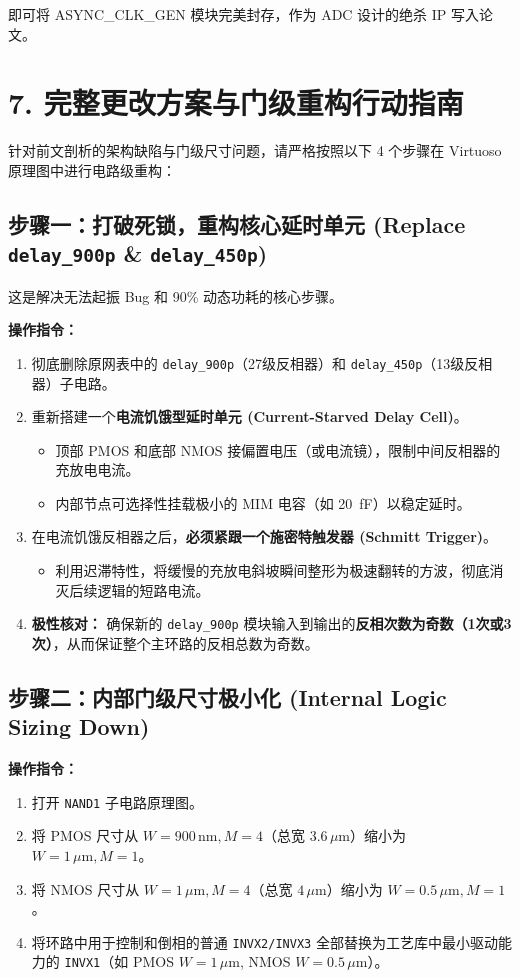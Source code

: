 \documentclass[11pt,a4paper,UTF8]{ctexart}
\begin{document}
即可将 ASYNC\_CLK\_GEN 模块完美封存，作为 ADC 设计的绝杀 IP 写入论文。

\section{7. 完整更改方案与门级重构行动指南}

针对前文剖析的架构缺陷与门级尺寸问题，请严格按照以下 4 个步骤在 Virtuoso 原理图中进行电路级重构：

\subsection{步骤一：打破死锁，重构核心延时单元 (Replace \texttt{delay\_900p} \& \texttt{delay\_450p})}

这是解决无法起振 Bug 和 90\% 动态功耗的核心步骤。

\textbf{操作指令：}
\begin{enumerate}
    \item 彻底删除原网表中的 \texttt{delay\_900p}（27级反相器）和 \texttt{delay\_450p}（13级反相器）子电路。
    \item 重新搭建一个\textbf{电流饥饿型延时单元 (Current-Starved Delay Cell)}。
    \begin{itemize}
        \item 顶部 PMOS 和底部 NMOS 接偏置电压（或电流镜），限制中间反相器的充放电电流。
        \item 内部节点可选择性挂载极小的 MIM 电容（如 \SI{20}{fF}）以稳定延时。
    \end{itemize}
    \item 在电流饥饿反相器之后，\textbf{必须紧跟一个施密特触发器 (Schmitt Trigger)}。
    \begin{itemize}
        \item 利用迟滞特性，将缓慢的充放电斜坡瞬间整形为极速翻转的方波，彻底消灭后续逻辑的短路电流。
    \end{itemize}
    \item \textbf{极性核对：} 确保新的 \texttt{delay\_900p} 模块输入到输出的\textbf{反相次数为奇数（1次或3次）}，从而保证整个主环路的反相总数为奇数。
\end{enumerate}

\subsection{步骤二：内部门级尺寸极小化 (Internal Logic Sizing Down)}

\textbf{操作指令：}
\begin{enumerate}
    \item 打开 \texttt{NAND1} 子电路原理图。
    \item 将 PMOS 尺寸从 $W=900\,\text{nm}, M=4$（总宽 $3.6\,\mu\text{m}$）缩小为 \textbf{$W=1\,\mu\text{m}, M=1$}。
    \item 将 NMOS 尺寸从 $W=1\,\mu\text{m}, M=4$（总宽 $4\,\mu\text{m}$）缩小为 \textbf{$W=0.5\,\mu\text{m}, M=1$}。
    \item 将环路中用于控制和倒相的普通 \texttt{INVX2/INVX3} 全部替换为工艺库中最小驱动能力的 \texttt{INVX1}（如 PMOS $W=1\,\mu\text{m}$, NMOS $W=0.5\,\mu\text{m}$）。
\end{enumerate}
\end{document}
